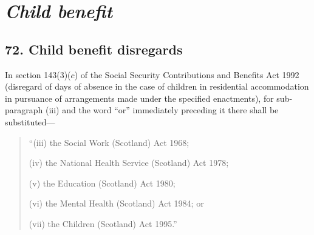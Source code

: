 \documentclass[12pt,a4paper]{article}
\begin{document}
%
%
%
%
%
%
%
%
%
%
%


\section{\itshape Child benefit}

\subsection{72. Child benefit disregards}

In section 143(3)($c$)  of the Social Security Contributions and Benefits Act 1992 (disregard of days of absence in the case of children in residential accommodation in pursuance of arrangements made under the specified enactments), for sub-paragraph (iii)  and the word “or” immediately preceding it there shall be substituted—
\begin{quotation}
“(iii) the Social Work (Scotland) Act 1968;

(iv) the National Health Service (Scotland) Act 1978;

(v) the Education (Scotland) Act 1980;

(vi) the Mental Health (Scotland) Act 1984; or

(vii) the Children (Scotland) Act 1995.”
\end{quotation}
\end{document}
